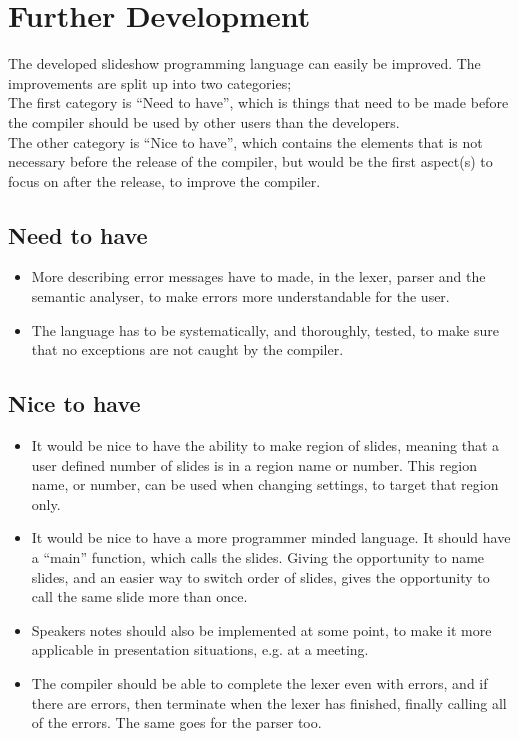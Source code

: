 \chapter{Further Development}
The developed slideshow programming language can easily be improved. The improvements are split up into two categories; \\
The first category is ``Need to have'', which is things that need to be made before the compiler should be used by other users than the developers. \\
The other category is ``Nice to have'', which contains the elements that is not necessary before the release of the compiler, but would be the first aspect(s) to focus on after the release, to improve the compiler.

\section{Need to have}
\begin{itemize}
	\item More describing error messages have to made, in the lexer, parser and the semantic analyser, to make errors more understandable for the user.
	\item The language has to be systematically, and thoroughly, tested, to make sure that no exceptions are not caught by the compiler.
\end{itemize}

\section{Nice to have}
\begin{itemize}
	\item It would be nice to have the ability to make region of slides, meaning that a user defined number of slides is in a region name or number. This region name, or number, can be used when changing settings, to target that region only.
	\item It would be nice to have a more programmer minded language. It should have a ``main'' function, which calls the slides. Giving the opportunity to name slides, and an easier way to switch order of slides, gives the opportunity to call the same slide more than once.
	\item Speakers notes should also be implemented at some point, to make it more applicable in presentation situations, e.g. at a meeting.
	\item The compiler should be able to complete the lexer even with errors, and if there are errors, then terminate when the lexer has finished, finally calling all of the errors. The same goes for the parser too.
\end{itemize}